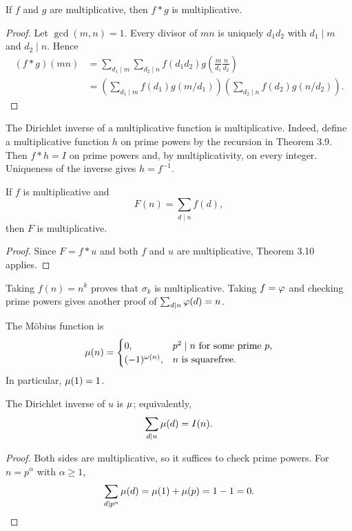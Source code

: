 \begin{thm}
If $f$ and $g$ are multiplicative, then $f*g$ is multiplicative.
\end{thm}
\begin{proof}
Let $\gcd(m,n)=1$.  Every divisor of $mn$ is uniquely $d_1d_2$ with $d_1\mid m$ and $d_2\mid n$.  Hence
\begin{align*}
 (f*g)(mn)
 &=\sum_{d_1\mid m}\sum_{d_2\mid n}
 f(d_1d_2)g\left(\frac m{d_1}\frac n{d_2}\right)\\
 &=\left(\sum_{d_1\mid m}f(d_1)g(m/d_1)\right)
   \left(\sum_{d_2\mid n}f(d_2)g(n/d_2)\right).
\end{align*}
\end{proof}

\begin{remark}
The Dirichlet inverse of a multiplicative function is multiplicative.  Indeed, define a multiplicative function $h$ on prime powers by the recursion in Theorem 3.9.  Then $f*h=I$ on prime powers and, by multiplicativity, on every integer.  Uniqueness of the inverse gives $h=f^{-1}$.
\end{remark}

\begin{thm}
If $f$ is multiplicative and
\[
 F(n)=\sum_{d\mid n}f(d),
\]
then $F$ is multiplicative.
\end{thm}
\begin{proof}
Since $F=f*u$ and both $f$ and $u$ are multiplicative, Theorem 3.10 applies.
\end{proof}
\begin{remark}
Taking $f(n)=n^k$ proves that $\sigma_k$ is multiplicative.  Taking $f=\varphi$ and checking prime powers gives another proof of
$\sum_{d\mid n}\varphi(d)=n$.
\end{remark}

\begin{de}
The M\"obius function is
\[
 \mu(n)=
 \begin{cases}
 0,&p^2\mid n\text{ for some prime }p,\\
 (-1)^{\omega(n)},&n\text{ is squarefree}.
 \end{cases}
\]
In particular, $\mu(1)=1$.
\end{de}

\begin{thm}
The Dirichlet inverse of $u$ is $\mu$; equivalently,
\[
 \sum_{d\mid n}\mu(d)=I(n).
\]
\end{thm}
\begin{proof}
Both sides are multiplicative, so it suffices to check prime powers.  For $n=p^\alpha$ with $\alpha\ge1$,
\[
 \sum_{d\mid p^\alpha}\mu(d)=\mu(1)+\mu(p)=1-1=0.
\]
\end{proof}

